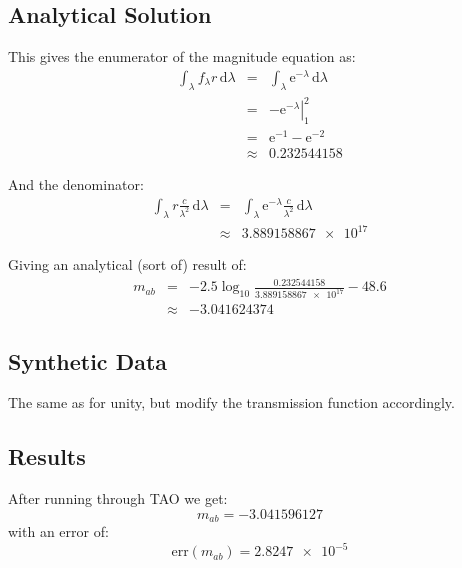 \documentclass[12pt]{scrartcl}
\newcommand{\dx}[1]{\ensuremath{\,\mathrm{d}#1}}
\begin{document}
\subsection{Analytical Solution}

This gives the enumerator of the magnitude equation as:
\begin{eqnarray*}
\int_\lambda f_\lambda r \dx{\lambda} & = & 
  \int_\lambda \mathrm{e}^{-\lambda} \dx{\lambda} \\
& = & \left. -\mathrm{e}^{-\lambda} \right|_1^2 \\
& = & \mathrm{e}^{-1} - \mathrm{e}^{-2} \\
& \approx & 0.232544158
\end{eqnarray*}

And the denominator:
\begin{eqnarray*}
\int_\lambda r \frac{c}{\lambda^2} \dx{\lambda}
& = & \int_\lambda \mathrm{e}^{-\lambda} \frac{c}{\lambda^2}
\dx{\lambda} \\
& \approx & \num{3.889158867e+17}
\end{eqnarray*}

Giving an analytical (sort of) result of:
\begin{eqnarray*}
m_{ab} & = & -2.5\log_{10} \frac{0.232544158}{\num{3.889158867e+17}} - 48.6 \\
& \approx & -3.041624374
\end{eqnarray*}

\subsection{Synthetic Data}

The same as for unity, but modify the transmission function accordingly.

\subsection{Results}

After running through TAO we get:
\[ m_{ab} = -3.041596127 \]
with an error of:
\[ \mathrm{err}(m_{ab}) = \num{2.8247e-5} \]




\end{document}
